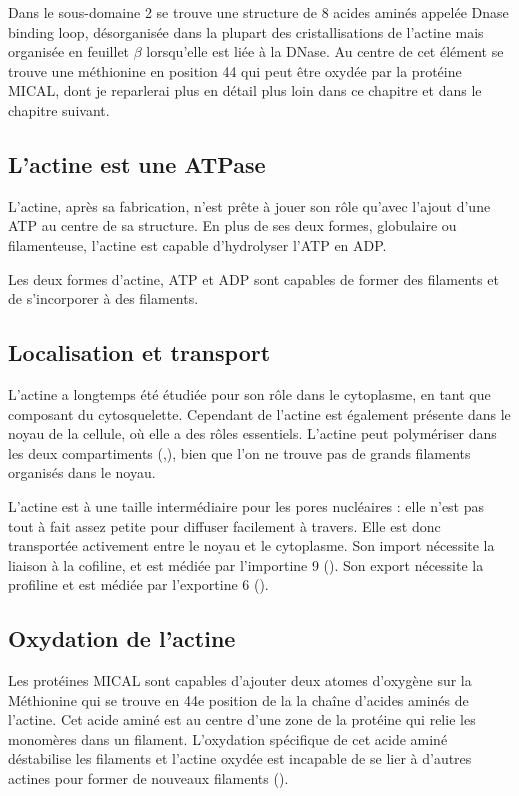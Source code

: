 \documentclass{report}
\begin{document}
Dans le sous-domaine 2 se trouve une structure de 8 acides aminés appelée Dnase binding loop, désorganisée dans la plupart des cristallisations de l'actine mais organisée en feuillet $\beta$ lorsqu'elle est liée à la DNase. Au centre de cet élément se trouve une méthionine en position 44 qui peut être oxydée par la protéine MICAL, dont je reparlerai plus en détail plus loin dans ce chapitre et dans le chapitre suivant. 

\subsection{L'actine est une ATPase}

L'actine, après sa fabrication, n'est prête à jouer son rôle qu'avec l'ajout d'une ATP au centre de sa structure.
En plus de ses deux formes, globulaire ou filamenteuse, l'actine est capable d'hydrolyser l'ATP en ADP.

Les deux formes d'actine, ATP et ADP sont capables de former des filaments et de s'incorporer à des filaments. 


\subsection{Localisation et transport}

L'actine a longtemps été étudiée pour son rôle dans le cytoplasme, en tant que composant du cytosquelette. Cependant de l'actine est également présente dans le noyau de la cellule, où elle a des rôles essentiels. 
L'actine peut polymériser dans les deux compartiments (\cite{mcdonald_nucleoplasmic_2006},\cite{baarlink_nuclear_2013}), bien que l'on ne trouve pas de grands filaments organisés dans le noyau. 

L'actine est à une taille intermédiaire pour les pores nucléaires : elle n'est pas tout à fait assez petite pour diffuser facilement à travers. Elle est donc transportée activement entre le noyau et le cytoplasme. 
Son import nécessite la liaison à la cofiline, et est médiée par l'importine 9 (\cite{dopie_active_2012}). Son export nécessite la profiline et est médiée par l'exportine 6 (\cite{dopie_active_2012}).



\subsection{Oxydation de l'actine}

Les protéines MICAL sont capables d'ajouter deux atomes d'oxygène sur la Méthionine qui se trouve en 44e position de la la chaîne d'acides aminés de l'actine. Cet acide aminé est au centre d'une zone de la protéine qui relie les monomères dans un filament. 
L'oxydation spécifique de cet acide aminé déstabilise les filaments et l'actine oxydée est incapable de se lier à d'autres actines pour former de nouveaux filaments (\cite{hung_direct_2011}). 
\end{document}
